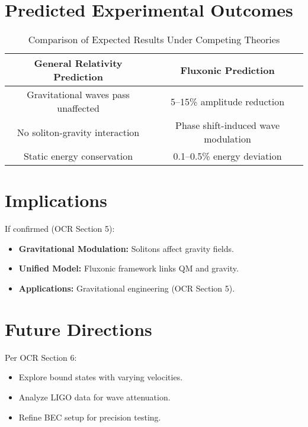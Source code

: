 \documentclass{article}
\begin{document}
\section{Predicted Experimental Outcomes}
\begin{table}[h]
    \centering
    \begin{tabular}{|c|c|}
        \hline
        \textbf{General Relativity Prediction} & \textbf{Fluxonic Prediction} \\
        \hline
        Gravitational waves pass unaffected & 5–15\% amplitude reduction \\
        No soliton-gravity interaction & Phase shift-induced wave modulation \\
        Static energy conservation & 0.1–0.5\% energy deviation \\
        \hline
    \end{tabular}
    \caption{Comparison of Expected Results Under Competing Theories}
    \label{tab:predictions}
\end{table}

\section{Implications}
If confirmed (OCR Section 5):
\begin{itemize}
    \item \textbf{Gravitational Modulation:} Solitons affect gravity fields.
    \item \textbf{Unified Model:} Fluxonic framework links QM and gravity.
    \item \textbf{Applications:} Gravitational engineering (OCR Section 5).
\end{itemize}

\section{Future Directions}
Per OCR Section 6:
\begin{itemize}
    \item Explore bound states with varying velocities.
    \item Analyze LIGO data for wave attenuation.
    \item Refine BEC setup for precision testing.
\end{itemize}
\end{document}
